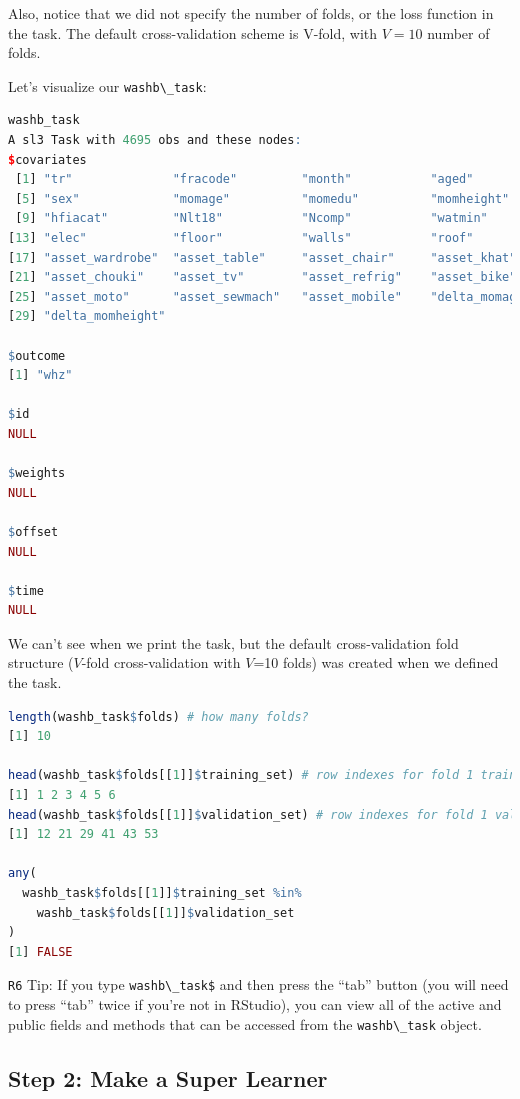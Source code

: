 \documentclass[12pt, krantz2,]{krantz}
\newcommand{\passthrough}[1]{#1}
\theoremstyle{definition}
\theoremstyle{definition}
\theoremstyle{definition}
\newcommand{\1}{\mathbbm{1}}
\begin{document}
Also, notice that we did not specify the number of folds, or the loss function
in the task. The default cross-validation scheme is V-fold, with \(V=10\) number
of folds.

Let's visualize our \passthrough{\lstinline!washb\_task!}:

\begin{lstlisting}[language=R]
washb_task
A sl3 Task with 4695 obs and these nodes:
$covariates
 [1] "tr"              "fracode"         "month"           "aged"           
 [5] "sex"             "momage"          "momedu"          "momheight"      
 [9] "hfiacat"         "Nlt18"           "Ncomp"           "watmin"         
[13] "elec"            "floor"           "walls"           "roof"           
[17] "asset_wardrobe"  "asset_table"     "asset_chair"     "asset_khat"     
[21] "asset_chouki"    "asset_tv"        "asset_refrig"    "asset_bike"     
[25] "asset_moto"      "asset_sewmach"   "asset_mobile"    "delta_momage"   
[29] "delta_momheight"

$outcome
[1] "whz"

$id
NULL

$weights
NULL

$offset
NULL

$time
NULL
\end{lstlisting}

We can't see when we print the task, but the default cross-validation fold
structure (\(V\)-fold cross-validation with \(V\)=10 folds) was created when we
defined the task.

\begin{lstlisting}[language=R]
length(washb_task$folds) # how many folds?
[1] 10

head(washb_task$folds[[1]]$training_set) # row indexes for fold 1 training
[1] 1 2 3 4 5 6
head(washb_task$folds[[1]]$validation_set) # row indexes for fold 1 validation
[1] 12 21 29 41 43 53

any(
  washb_task$folds[[1]]$training_set %in%
    washb_task$folds[[1]]$validation_set
)
[1] FALSE
\end{lstlisting}

\passthrough{\lstinline!R6!} Tip: If you type \passthrough{\lstinline!washb\_task$!} and then press the ``tab'' button (you will
need to press ``tab'' twice if you're not in RStudio), you can view all of the
active and public fields and methods that can be accessed from the \passthrough{\lstinline!washb\_task!}
object.

\hypertarget{step-2-make-a-super-learner}{%
\subsection{Step 2: Make a Super Learner}\label{step-2-make-a-super-learner}}
\end{document}
